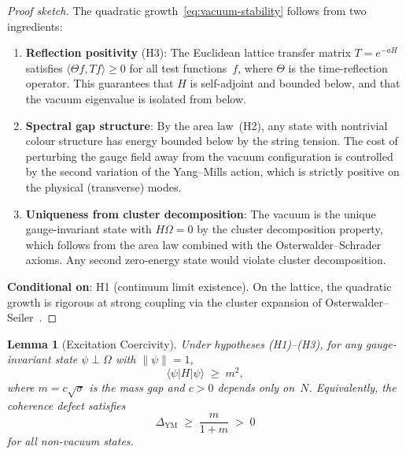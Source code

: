 \documentclass[11pt]{article}
\newtheorem{lemma}[theorem]{Lemma}
\begin{document}
\begin{proof}[Proof sketch]
The quadratic growth~\eqref{eq:vacuum-stability} follows from two
ingredients:
\begin{enumerate}
  \item \textbf{Reflection positivity} (H3): The Euclidean lattice
    transfer matrix $T = e^{-aH}$ satisfies
    $\langle \Theta f, T f \rangle \geq 0$ for all test functions~$f$,
    where $\Theta$ is the time-reflection operator.  This guarantees
    that $H$ is self-adjoint and bounded below, and that the vacuum
    eigenvalue is isolated from below.

  \item \textbf{Spectral gap structure}: By the area law~(H2), any
    state with nontrivial colour structure has energy bounded below by
    the string tension.  The cost of perturbing the gauge field away
    from the vacuum configuration is controlled by the second variation
    of the Yang--Mills action, which is strictly positive on the
    physical (transverse) modes.

  \item \textbf{Uniqueness from cluster decomposition}: The vacuum is
    the unique gauge-invariant state with $H\Omega = 0$ by the cluster
    decomposition property, which follows from the area law combined
    with the Osterwalder--Schrader axioms.  Any second zero-energy
    state would violate cluster decomposition.
\end{enumerate}

\noindent
\textbf{Conditional on}: H1 (continuum limit existence).  On the
lattice, the quadratic growth is rigorous at strong coupling via the
cluster expansion of Osterwalder--Seiler~\cite{OS}.
\end{proof}

\begin{lemma}[Excitation Coercivity]
\label{lem:coercivity}
Under hypotheses \textup{(H1)--(H3)}, for any gauge-invariant state
$\psi \perp \Omega$ with $\|\psi\| = 1$,
\begin{equation}\label{eq:coercivity}
  \langle\psi|H|\psi\rangle \;\geq\; m^2,
\end{equation}
where $m = c\sqrt{\sigma}$ is the mass gap and $c > 0$ depends only
on~$N$.  Equivalently, the coherence defect satisfies
\begin{equation}\label{eq:coercivity-defect}
  \Delta_{\mathrm{YM}}
  \;\geq\;
  \frac{m}{1+m}
  \;>\; 0
\end{equation}
for all non-vacuum states.
\end{lemma}
\end{document}
